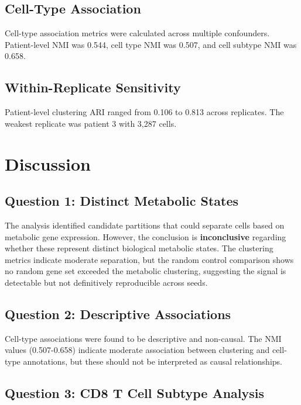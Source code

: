 \documentclass[sloppy]{article}
\begin{document}
\subsection{Cell-Type Association}

Cell-type association metrics were calculated across multiple confounders. Patient-level NMI was 0.544, cell type NMI was 0.507, and cell subtype NMI was 0.658.

\subsection{Within-Replicate Sensitivity}

Patient-level clustering ARI ranged from 0.106 to 0.813 across replicates. The weakest replicate was patient 3 with 3,287 cells.

\section{Discussion}

\subsection{Question 1: Distinct Metabolic States}

The analysis identified candidate partitions that could separate cells based on metabolic gene expression. However, the conclusion is \textbf{inconclusive} regarding whether these represent distinct biological metabolic states. The clustering metrics indicate moderate separation, but the random control comparison shows no random gene set exceeded the metabolic clustering, suggesting the signal is detectable but not definitively reproducible across seeds.

\subsection{Question 2: Descriptive Associations}

Cell-type associations were found to be descriptive and non-causal. The NMI values (0.507-0.658) indicate moderate association between clustering and cell-type annotations, but these should not be interpreted as causal relationships.

\subsection{Question 3: CD8 T Cell Subtype Analysis}
\end{document}
